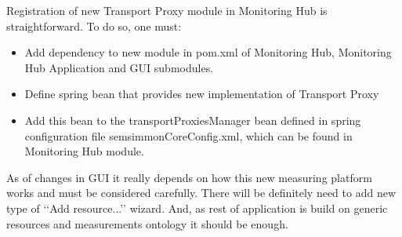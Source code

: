 Registration of new Transport Proxy module in Monitoring Hub is straightforward. To do so, one must:
\begin{itemize}
\item Add dependency to new module in pom.xml of Monitoring Hub, Monitoring Hub Application and GUI  submodules.
\item Define spring bean that provides new implementation of Transport Proxy 
\item Add this bean to the transportProxiesManager bean defined in spring configuration file semsimmonCoreConfig.xml, which can be found in Monitoring Hub module.
\end{itemize}

As of changes in GUI it really depends on how this new measuring platform works and must be considered carefully. There will be definitely need to add new type of \lq\lq{}Add resource...\rq\rq{} wizard. And, as rest of application is build on generic resources and measurements ontology it should be enough.